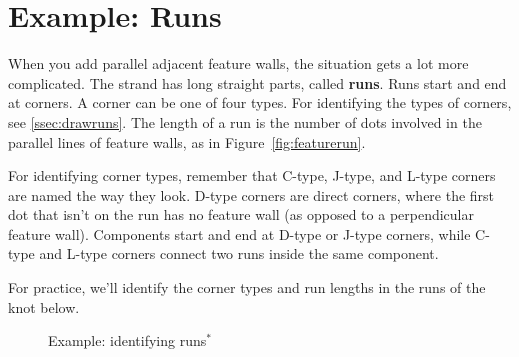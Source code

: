 \documentclass[openany]{book}
\newcommand{\gen}{\hyperref[generated]{$^*$}}%
\begin{document}
\section{Example: Runs}\label{ssec:nomath_run}

When you add parallel adjacent feature walls, the situation gets a lot more complicated. The strand has long straight parts, called \textbf{runs}. Runs start and end at corners. A corner can be one of four types. For identifying the types of corners, see \ref{ssec:drawruns}. The length of a run is the number of dots involved in the parallel lines of feature walls, as in Figure~\ref{fig:featurerun}.

For identifying corner types, remember that C-type, J-type, and L-type corners are named the way they look. D-type corners are direct corners, where the first dot that isn't on the run has no feature wall (as opposed to a perpendicular feature wall). Components start and end at D-type or J-type corners, while C-type and L-type corners connect two runs inside the same component.\medskip

For practice, we'll identify the corner types and run lengths in the runs of the knot below.

\begin{figure}[H]\centering
{}
\caption{Example: identifying runs\gen}
\end{figure}
\end{document}
